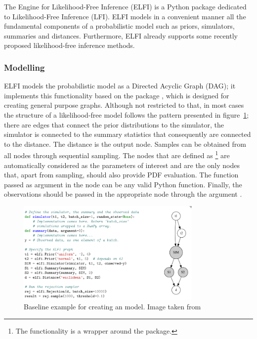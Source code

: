 The Engine for Likelihood-Free Inference (ELFI) \cite{1708.00707}
is a Python package dedicated to Likelihood-Free Inference (LFI). ELFI
models in a convenient manner all the fundamental components of a
probabilistic model such as priors, simulators, summaries and
distances. Furthermore, ELFI already supports some recently proposed
likelihood-free inference methods.

\subsubsection{Modelling}
\label{sec:modelling}

ELFI models the probabilistic model as a Directed Acyclic Graph (DAG);
it implements this functionality based on the package
, which is designed for creating general purpose
graphs. Although not restricted to that, in most cases the structure
of a likelihood-free model follows the pattern presented in
figure~\ref{fig:elfi}; there are edges that connect the prior
distributions to the simulator, the simulator is connected to the
summary statistics that consequently are connected to the
distance. The distance is the output node. Samples can be obtained
from all nodes through sequential sampling. The nodes that are defined
as \footnote{The  functionality
  is a wrapper around the  package.} are automatically
considered as the parameters of interest and are the only nodes that,
apart from sampling, should also provide PDF evaluation. The function
passed as argument in the  node can be any valid
Python function. Finally, the observations should be passed in the
appropriate node through the argument .

\begin{figure}[!ht]
    \begin{center}
      \includegraphics[width=0.8\textwidth]{./latex_files/images/chapter2/elfi.png}
    \end{center}
    \caption[Baseline example for creating an  model]{Baseline example for creating an  model. Image taken from \cite{1708.00707}}
    \label{fig:elfi}
\end{figure}


